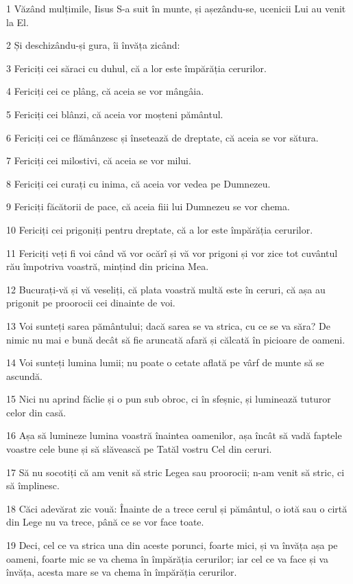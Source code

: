 \par 1 Văzând mulțimile, Iisus S-a suit în munte, și așezându-se, ucenicii Lui au venit la El.
\par 2 Și deschizându-și gura, îi învăța zicând:
\par 3 Fericiți cei săraci cu duhul, că a lor este împărăția cerurilor.
\par 4 Fericiți cei ce plâng, că aceia se vor mângâia.
\par 5 Fericiți cei blânzi, că aceia vor moșteni pământul.
\par 6 Fericiți cei ce flămânzesc și însetează de dreptate, că aceia se vor sătura.
\par 7 Fericiți cei milostivi, că aceia se vor milui.
\par 8 Fericiți cei curați cu inima, că aceia vor vedea pe Dumnezeu.
\par 9 Fericiți făcătorii de pace, că aceia fiii lui Dumnezeu se vor chema.
\par 10 Fericiți cei prigoniți pentru dreptate, că a lor este împărăția cerurilor.
\par 11 Fericiți veți fi voi când vă vor ocărî și vă vor prigoni și vor zice tot cuvântul rău împotriva voastră, mințind din pricina Mea.
\par 12 Bucurați-vă și vă veseliți, că plata voastră multă este în ceruri, că așa au prigonit pe proorocii cei dinainte de voi.
\par 13 Voi sunteți sarea pământului; dacă sarea se va strica, cu ce se va săra? De nimic nu mai e bună decât să fie aruncată afară și călcată în picioare de oameni.
\par 14 Voi sunteți lumina lumii; nu poate o cetate aflată pe vârf de munte să se ascundă.
\par 15 Nici nu aprind făclie și o pun sub obroc, ci în sfeșnic, și luminează tuturor celor din casă.
\par 16 Așa să lumineze lumina voastră înaintea oamenilor, așa încât să vadă faptele voastre cele bune și să slăvească pe Tatăl vostru Cel din ceruri.
\par 17 Să nu socotiți că am venit să stric Legea sau proorocii; n-am venit să stric, ci să împlinesc.
\par 18 Căci adevărat zic vouă: Înainte de a trece cerul și pământul, o iotă sau o cirtă din Lege nu va trece, până ce se vor face toate.
\par 19 Deci, cel ce va strica una din aceste porunci, foarte mici, și va învăța așa pe oameni, foarte mic se va chema în împărăția cerurilor; iar cel ce va face și va învăța, acesta mare se va chema în împărăția cerurilor.
